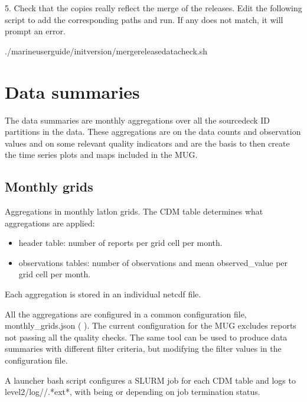 \documentclass[letterpaper,10pt,english]{sphinxmanual}
\begin{document}
5. Check that the copies really reflect the merge of the releases. Edit the following script to add the corresponding paths and run. If any does not match, it will prompt an error.

\begin{sphinxVerbatim}[commandchars=\\\{\}]
./marine\PYGZhy{}user\PYGZhy{}guide/init\PYGZus{}version/merge\PYGZus{}release\PYGZus{}data\PYGZus{}check.sh
\end{sphinxVerbatim}


\section{Data summaries}
\label{\detokenize{index:data-summaries}}
The data summaries are monthly aggregations over all the source\sphinxhyphen{}deck ID partitions
in the data. These aggregations are on the data counts and observation values
and on some relevant quality indicators and are the basis to then create the
time series plots and maps included in the MUG.


\subsection{Monthly grids}
\label{\detokenize{index:monthly-grids}}\label{\detokenize{index:monthly-grids-um-section}}
Aggregations in monthly lat\sphinxhyphen{}lon grids. The CDM table determines what
aggregations are applied:
\begin{itemize}
\item {} 
header table: number of reports per grid cell per month.

\item {} 
observations tables: number of observations and mean observed\_value per grid cell per month.

\end{itemize}

Each aggregation is stored in an individual netcdf file.

All the aggregations are configured in a common configuration file,
monthly\_grids.json ( {\hyperref[\detokenize{index:mon-grids-um}]{}}). The current configuration for the MUG
excludes reports not passing all the quality checks. The same tool can be used
to produce data summaries with different filter criteria, but modifying the
filter values in the configuration file.

A launcher bash script configures a SLURM job for each CDM table and logs
to level2/log//\sphinxhyphen{}.*ext*, with  being  or
 depending on job termination status.
\end{document}
